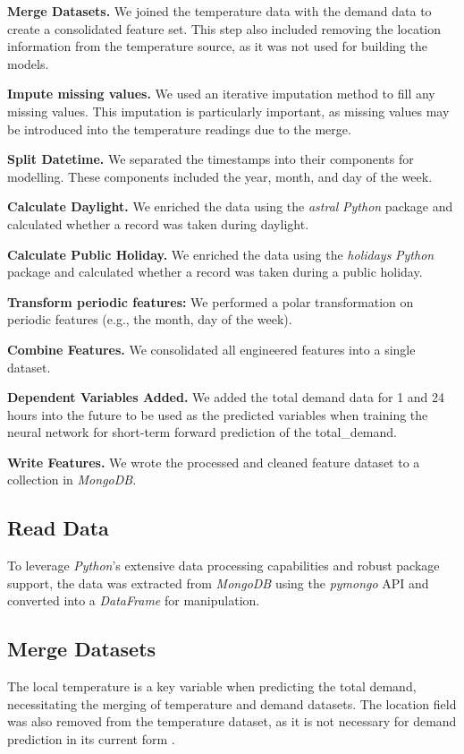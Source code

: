 \documentclass[mstat,12pt]{unswthesis}
\begin{document}
\textbf{Merge Datasets.} We joined the temperature data with the demand data to create a consolidated feature set. This step also included removing the location information from the temperature source, as it was not used for building the models.

\textbf{Impute missing values.} We used an iterative imputation method to fill any missing values. This imputation is particularly important, as missing values may be introduced into the temperature readings due to the merge.

\textbf{Split Datetime.} We separated the timestamps into their components for modelling. These components included the year, month, and day of the week.

\textbf{Calculate Daylight.} We enriched the data using the \textit{astral} \textit{Python} package and calculated whether a record was taken during daylight.

\textbf{Calculate Public Holiday.} We enriched the data using the \textit{holidays} \textit{Python} package and calculated whether a record was taken during a public holiday.

\textbf{Transform periodic features:} We performed a polar transformation on periodic features (e.g., the month, day of the week).

\textbf{Combine Features.} We consolidated all engineered features into a single dataset.

\textbf{Dependent Variables Added.} We added the total demand data for 1 and 24 hours into the future to be used as the predicted variables when training the neural network for short-term forward prediction of the total\_demand.

\textbf{Write Features.} We wrote the processed and cleaned feature dataset to a collection in \textit{MongoDB}.

\hypertarget{read-data}{%
\subsection{Read Data}\label{pre-processing-steps}}
To leverage \textit{Python}'s extensive data processing capabilities and robust package support, the data was extracted from \textit{MongoDB} using the \textit{pymongo} API and converted into a \textit{DataFrame} for manipulation.

\hypertarget{merge-datasets}{%
\subsection{Merge Datasets}\label{merge-datasets}}
The local temperature is a key variable when predicting the total demand, necessitating the merging of temperature and demand datasets. The location field was also removed from the temperature dataset, as it is not necessary for demand prediction in its current form \cite{DeCian2007}.
\end{document}
